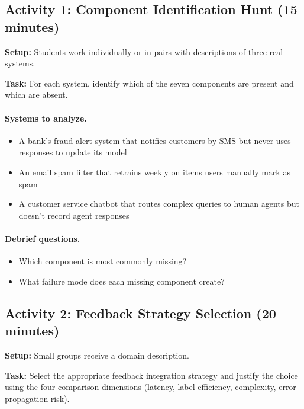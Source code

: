 \subsection{Activity 1: Component Identification Hunt (15 minutes)}

\textbf{Setup:} Students work individually or in pairs with descriptions of three real systems.

\textbf{Task:} For each system, identify which of the seven components are present and which are absent.

\paragraph{Systems to analyze.}
\begin{itemize}
    \item A bank's fraud alert system that notifies customers by SMS but never uses responses to update its model
    \item An email spam filter that retrains weekly on items users manually mark as spam
    \item A customer service chatbot that routes complex queries to human agents but doesn't record agent responses
\end{itemize}

\paragraph{Debrief questions.}
\begin{itemize}
    \item Which component is most commonly missing?
    \item What failure mode does each missing component create?
\end{itemize}

\subsection{Activity 2: Feedback Strategy Selection (20 minutes)}

\textbf{Setup:} Small groups receive a domain description.

\textbf{Task:} Select the appropriate feedback integration strategy and justify the choice using the four comparison dimensions (latency, label efficiency, complexity, error propagation risk).


